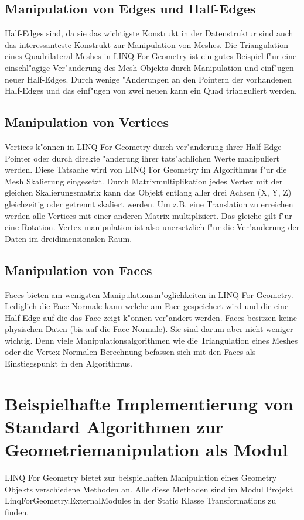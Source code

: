 \documentclass[pagesize, paper=a4, fontsize=12pt,titlepage=true, headings=small, headnosepline, abstractoff, liststotoc, nochapterprefix, plainheadsepline]{scrreprt}
\newcommand{\LFG}{LINQ For Geometry}
\newcommand{\LFGS}{LINQ For Geometry }
\begin{document}
		\subsection {Manipulation von Edges und Half-Edges}
			Half-Edges sind, da sie das wichtigste Konstrukt in der Datenstruktur sind auch das interessanteste Konstrukt zur Manipulation von Meshes. Die Triangulation eines Quadrilateral Meshes in \LFGS ist ein gutes Beispiel f"ur eine einschl"agige Ver"anderung des Mesh Objekts durch Manipulation und einf"ugen neuer Half-Edges. Durch wenige "Anderungen an den Pointern der vorhandenen Half-Edges und das einf"ugen von zwei neuen kann ein Quad trianguliert werden.

		\subsection {Manipulation von Vertices}
			Vertices k"onnen in \LFGS durch ver"anderung ihrer Half-Edge Pointer oder durch direkte "anderung ihrer tats"achlichen Werte manipuliert werden. Diese Tatsache wird von \LFGS im Algorithmus f"ur die Mesh Skalierung eingesetzt. Durch Matrixmultiplikation jedes Vertex mit der gleichen Skalierungsmatrix kann das Objekt entlang aller drei Achsen (X, Y, Z) gleichzeitig oder getrennt skaliert werden. Um z.B. eine Translation zu erreichen werden alle Vertices mit einer anderen Matrix multipliziert. Das gleiche gilt f"ur eine Rotation. Vertex manipulation ist also unersetzlich f"ur die Ver"anderung der Daten im dreidimensionalen Raum.
		\subsection {Manipulation von Faces}
			Faces bieten am wenigsten Manipulationsm"oglichkeiten in \LFG. Lediglich die Face Normale kann welche am Face gespeichert wird und die eine Half-Edge auf die das Face zeigt k"onnen ver"andert werden. Faces besitzen keine physischen Daten (bis auf die Face Normale). Sie sind darum aber nicht weniger wichtig. Denn viele Manipulationsalgorithmen wie die Triangulation eines Meshes oder die Vertex Normalen Berechnung befassen sich mit den Faces als Einstiegspunkt in den Algorithmus.
	\section {Beispielhafte Implementierung von Standard Algorithmen zur Geometriemanipulation als Modul}
	\LFGS bietet zur beispielhaften Manipulation eines Geometry Objekts verschiedene Methoden an. Alle diese Methoden sind im Modul Projekt LinqForGeometry.ExternalModules in der Static Klasse Transformations zu finden.
\end{document}

